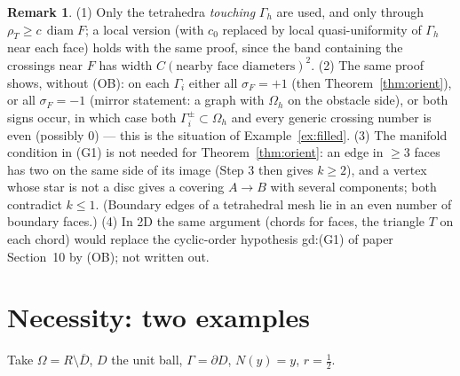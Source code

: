 \documentclass[11pt]{article}
\theoremstyle{definition}
\newtheorem{remark}[theorem]{Remark}
\newcommand{\Gh}{\Gamma_h}
\newcommand{\Oh}{\Omega_h}
\DeclareMathOperator{\diam}{diam}
\begin{document}
\begin{remark}
(1) Only the tetrahedra \emph{touching} $\Gh$ are used, and only through $\rho_T\ge c\,\diam F$; a local version (with $c_0$ replaced by local quasi-uniformity of $\Gh$ near each face) holds with the same proof, since the band containing the crossings near $F$ has width $C(\text{nearby face diameters})^2$.
(2) The same proof shows, without (OB): on each $\Gamma_i$ either all $\sigma_F=+1$ (then Theorem~\ref{thm:orient}), or all $\sigma_F=-1$ (mirror statement: a graph with $\Oh$ on the obstacle side), or both signs occur, in which case both $\Gamma_i^\pm\subset\Oh$ and every generic crossing number is even (possibly $0$) --- this is the situation of Example~\ref{ex:filled}.
(3) The manifold condition in (G1) is not needed for Theorem~\ref{thm:orient}: an edge in $\ge3$ faces has two on the same side of its image (Step 3 then gives $k\ge2$), and a vertex whose star is not a disc gives a covering $A\to B$ with several components; both contradict $k\le1$. (Boundary edges of a tetrahedral mesh lie in an even number of boundary faces.)
(4) In 2D the same argument (chords for faces, the triangle $T$ on each chord) would replace the cyclic-order hypothesis gd:(G1) of paper Section~10 by (OB); not written out.
\end{remark}

\section{Necessity: two examples}
Take $\Omega=R\setminus\overline D$, $D$ the unit ball, $\Gamma=\partial D$, $N(y)=y$, $r=\frac12$.
\end{document}
